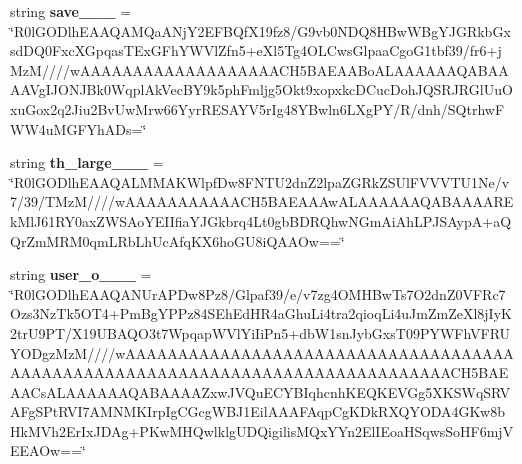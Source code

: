\begin{DoxyCompactItemize}
\item 
\mbox{\label{class_c_utils_1_1_utils_1_1_resources_1_1_icons_a5c77f6999994712634e7074df69da2c6}} 
string {\bfseries save\+\_\+\_\+\_} = \char`\"{}R0l\+G\+O\+Dlh\+E\+A\+A\+Q\+A\+M\+Qa\+A\+Nj\+Y2\+E\+F\+B\+Qf\+X19fz8/G9vb0\+N\+D\+Q8\+H\+Bw\+W\+Bg\+Y\+J\+G\+Rkb\+Gxsd\+D\+Q0\+Fxc\+X\+Gpqas\+T\+Ex\+G\+Fh\+Y\+W\+Vl\+Zfn5+e\+Xl5\+Tg4\+O\+L\+Cws\+Glpaa\+Cgo\+G1tbf39/fr6+j\+MzM////w\+A\+A\+A\+A\+A\+A\+A\+A\+A\+A\+A\+A\+A\+A\+A\+A\+A\+A\+A\+C\+H5\+B\+A\+E\+A\+A\+Bo\+A\+L\+A\+A\+A\+A\+A\+A\+Q\+A\+B\+A\+A\+A\+A\+Vg\+I\+J\+O\+N\+J\+Bk0\+Wqpl\+Ak\+Vec\+B\+Y9k5ph\+Fmljg5\+Okt9xopxkc\+D\+Cuc\+Doh\+J\+Q\+S\+R\+J\+R\+Gl\+Uu\+Oxu\+Gox2q2\+Jiu2\+Bv\+Uw\+Mrw66\+Yyr\+R\+E\+S\+A\+Y\+V5r\+Ig48\+Y\+Bwln6\+L\+Xg\+PY/R/dnh/S\+Qtrhw\+F\+W\+W4u\+M\+G\+F\+Yh\+A\+Ds=\char`\"{}
\item 
\mbox{\label{class_c_utils_1_1_utils_1_1_resources_1_1_icons_ac6e4184b2e2aa368675e72b8d515c1a8}} 
string {\bfseries th\+\_\+large\+\_\+\_\+\_} = \char`\"{}R0l\+G\+O\+Dlh\+E\+A\+A\+Q\+A\+L\+M\+M\+A\+K\+Wlpf\+Dw8\+F\+N\+T\+U2dn\+Z2lpa\+Z\+G\+Rk\+Z\+S\+Ul\+F\+V\+V\+V\+T\+U1\+Ne/v7/39/T\+MzM////w\+A\+A\+A\+A\+A\+A\+A\+A\+A\+A\+A\+C\+H5\+B\+A\+E\+A\+A\+Aw\+A\+L\+A\+A\+A\+A\+A\+A\+Q\+A\+B\+A\+A\+A\+A\+R\+Ek\+Ml\+J61\+R\+Y0ax\+Z\+W\+S\+Ao\+Y\+E\+I\+Ifia\+Y\+J\+Gkbrq4\+Lt0gb\+B\+D\+R\+Qhw\+N\+Gm\+Ai\+Ah\+L\+P\+J\+S\+AypA+a\+Q\+Qr\+Zm\+M\+R\+M0qm\+L\+Rb\+Lh\+Uc\+Afq\+K\+X6ho\+G\+U8i\+Q\+A\+A\+Ow==\char`\"{}
\item 
\mbox{\label{class_c_utils_1_1_utils_1_1_resources_1_1_icons_ada89a45b7e7c43a26fa9d49cc22f3590}} 
string {\bfseries user\+\_\+o\+\_\+\_\+\_} = \char`\"{}R0l\+G\+O\+Dlh\+E\+A\+A\+Q\+A\+N\+Ur\+A\+P\+Dw8\+Pz8/Glpaf39/e/v7zg4\+O\+M\+H\+Bw\+Ts7\+O2dn\+Z0\+V\+F\+Rc7\+Ozs3\+Nz\+Tk5\+O\+T4+Pm\+Bg\+Y\+P\+Pz84\+S\+Eh\+Ed\+H\+R4a\+Ghu\+Li4tra2qioq\+Li4u\+Jm\+Zm\+Ze\+Xl8j\+Iy\+K2tr\+U9\+PT/X19\+U\+B\+A\+Q\+O3t7\+Wpqap\+W\+Vl\+Yi\+Ii\+Pn5+db\+W1sn\+Jyb\+Gxs\+T09\+P\+Y\+W\+Fh\+V\+F\+R\+U\+Y\+O\+Dgz\+MzM////w\+A\+A\+A\+A\+A\+A\+A\+A\+A\+A\+A\+A\+A\+A\+A\+A\+A\+A\+A\+A\+A\+A\+A\+A\+A\+A\+A\+A\+A\+A\+A\+A\+A\+A\+A\+A\+A\+A\+A\+A\+A\+A\+A\+A\+A\+A\+A\+A\+A\+A\+A\+A\+A\+A\+A\+A\+A\+A\+A\+A\+A\+A\+A\+A\+A\+A\+A\+A\+A\+A\+A\+A\+A\+A\+A\+A\+A\+A\+A\+C\+H5\+B\+A\+E\+A\+A\+Cs\+A\+L\+A\+A\+A\+A\+A\+A\+Q\+A\+B\+A\+A\+A\+A\+Zxw\+J\+V\+Qu\+E\+C\+Y\+B\+Iqhcnh\+K\+E\+Q\+K\+E\+V\+Gg5\+X\+K\+S\+Wq\+S\+R\+V\+A\+Fg\+S\+Pt\+R\+V\+I7\+A\+M\+N\+M\+K\+Irp\+Ig\+C\+Gcg\+W\+B\+J1\+Eil\+A\+A\+A\+F\+Aqp\+Cg\+K\+Dk\+R\+X\+Q\+Y\+O\+D\+A4\+G\+Kw8b\+Hk\+M\+Vh2\+Er\+Ix\+J\+D\+Ag+P\+Kw\+M\+H\+Qwlklg\+U\+D\+Qigilis\+M\+Qx\+Y\+Yn2\+El\+I\+Eoa\+H\+Sqws\+So\+H\+F6mj\+V\+E\+E\+A\+Ow==\char`\"{}

\end{DoxyCompactItemize}
